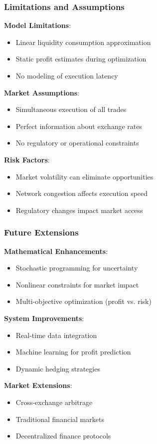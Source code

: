 \documentclass{beamer}
\begin{document}
\begin{frame}
\frametitle{Limitations and Assumptions}
\textbf{Model Limitations}:
\begin{itemize}
    \item Linear liquidity consumption approximation
    \item Static profit estimates during optimization
    \item No modeling of execution latency
\end{itemize}

\vspace{0.5cm}

\textbf{Market Assumptions}:
\begin{itemize}
    \item Simultaneous execution of all trades
    \item Perfect information about exchange rates
    \item No regulatory or operational constraints
\end{itemize}

\vspace{0.5cm}

\textbf{Risk Factors}:
\begin{itemize}
    \item Market volatility can eliminate opportunities
    \item Network congestion affects execution speed
    \item Regulatory changes impact market access
\end{itemize}
\end{frame}

\begin{frame}
\frametitle{Future Extensions}
\textbf{Mathematical Enhancements}:
\begin{itemize}
    \item Stochastic programming for uncertainty
    \item Nonlinear constraints for market impact
    \item Multi-objective optimization (profit vs. risk)
\end{itemize}

\vspace{0.5cm}

\textbf{System Improvements}:
\begin{itemize}
    \item Real-time data integration
    \item Machine learning for profit prediction
    \item Dynamic hedging strategies
\end{itemize}

\vspace{0.5cm}

\textbf{Market Extensions}:
\begin{itemize}
    \item Cross-exchange arbitrage
    \item Traditional financial markets
    \item Decentralized finance protocols
\end{itemize}
\end{frame}
\end{document}
